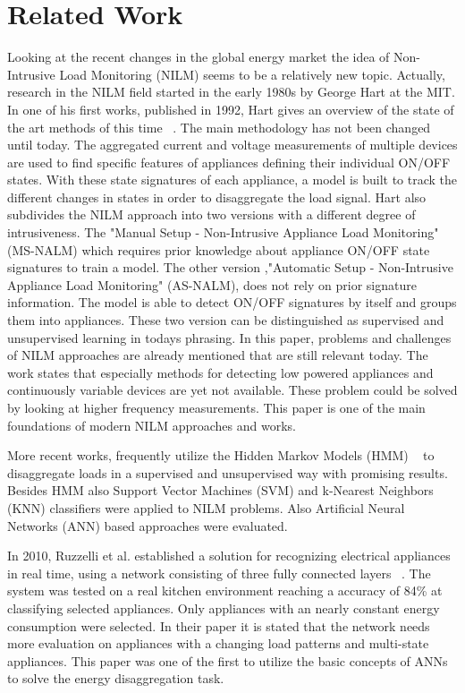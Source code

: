\documentclass[sigconf]{acmart}
\begin{document}
\section{Related Work}\label{chapter:relatedwork}
Looking at the recent changes in the global energy market the idea of Non-Intrusive Load Monitoring (NILM) seems to be a relatively new topic.
Actually, research in the NILM field started in the early 1980s by George Hart at the MIT.
In one of his first works, published in 1992, Hart gives an overview of the state of the art methods of this time ~\cite{HART}.
The main methodology has not been changed until today.
The aggregated current and voltage measurements of multiple devices are used to find specific features of appliances defining their individual ON/OFF states.
With these state signatures of each appliance, a model is built to track the different changes in states in order to disaggregate the load signal.
Hart also subdivides the NILM approach into two versions with a different degree of intrusiveness.
The "Manual Setup - Non-Intrusive Appliance Load Monitoring" (MS-NALM) which requires prior knowledge about appliance ON/OFF state signatures to train a model.
The other version ,"Automatic Setup - Non-Intrusive Appliance Load Monitoring" (AS-NALM), does not rely on prior signature information.
The model is able to detect ON/OFF signatures by itself and groups them into appliances. 
These two version can be distinguished as supervised and unsupervised learning in todays phrasing.
In this paper, problems and challenges of NILM approaches are already mentioned that are still relevant today.
The work states that especially methods for detecting low powered appliances and continuously variable devices are yet not available.
These problem could be solved by looking at higher frequency measurements.
This paper is one of the main foundations of modern NILM approaches and works.

More recent works, frequently utilize the Hidden Markov Models (HMM) ~\cite{Zia2011AHM, Kolter2012ApproximateII, Zhong2014SignalAC, Mueller2014HiddenMM, Kolter2012ApproximateII, Johnson2013BayesianNH, Pattem2012UnsupervisedDF} to disaggregate loads in a supervised and unsupervised way with promising results.
Besides HMM also Support Vector Machines (SVM) \cite{Du2012SupportVM,FEATURES} and k-Nearest Neighbors (KNN) \cite{FEATURES} classifiers were applied to NILM problems.
Also Artificial Neural Networks (ANN) based approaches were evaluated.

In 2010, Ruzzelli et al. established a solution for recognizing electrical appliances in real time, using a network consisting of three fully connected layers ~\cite{Ruzzelli2010RealTimeRA}.
The system was tested on a real kitchen environment reaching a accuracy of 84\% at classifying selected appliances.
Only appliances with an nearly constant energy consumption were selected.
In their paper it is stated that the network needs more evaluation on appliances with a changing load patterns and multi-state appliances.
This paper was one of the first to utilize the basic concepts of ANNs to solve the energy disaggregation task. 
\end{document}
